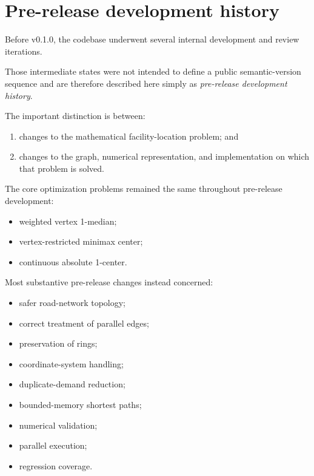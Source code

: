 \documentclass[11pt]{article}
\begin{document}
\section{Pre-release development history}

Before v0.1.0, the codebase underwent several internal development and review
iterations.

Those intermediate states were not intended to define a public semantic-version
sequence and are therefore described here simply as \emph{pre-release
development history}.

The important distinction is between:

\begin{enumerate}[leftmargin=1.5em]

\item changes to the mathematical facility-location problem; and

\item changes to the graph, numerical representation, and implementation on
which that problem is solved.

\end{enumerate}

The core optimization problems remained the same throughout pre-release
development:

\begin{itemize}[leftmargin=1.5em]

\item weighted vertex 1-median;

\item vertex-restricted minimax center;

\item continuous absolute 1-center.

\end{itemize}

Most substantive pre-release changes instead concerned:

\begin{itemize}[leftmargin=1.5em]

\item safer road-network topology;

\item correct treatment of parallel edges;

\item preservation of rings;

\item coordinate-system handling;

\item duplicate-demand reduction;

\item bounded-memory shortest paths;

\item numerical validation;

\item parallel execution;

\item regression coverage.

\end{itemize}
\end{document}
